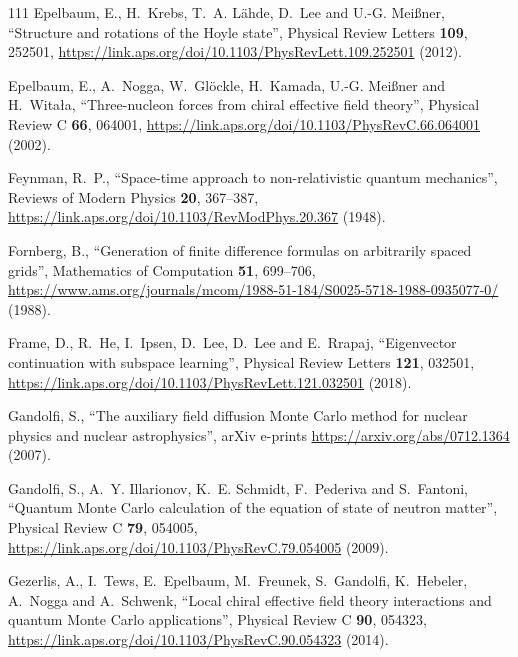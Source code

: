 \documentclass[12pt,letterpaper,UTF8]{report}
\begin{document}
{\begin{thebibliography}{111}
Epelbaum, E., H.~Krebs, T.~A. L\"ahde, D.~Lee and U.-G. Mei\ss{}ner,
  \enquote{Structure and rotations of the {Hoyle} state}, Physical Review
  Letters \textbf{109}, 252501,
  \urlprefix\url{https://link.aps.org/doi/10.1103/PhysRevLett.109.252501}
  (2012).

Epelbaum, E., A.~Nogga, W.~Gl\"ockle, H.~Kamada, U.-G. Mei\ss{}ner and
  H.~Wita\l{}a, \enquote{Three-nucleon forces from chiral effective field
  theory}, Physical Review C \textbf{66}, 064001,
  \urlprefix\url{https://link.aps.org/doi/10.1103/PhysRevC.66.064001} (2002).

Feynman, R.~P., \enquote{Space-time approach to non-relativistic quantum
  mechanics}, Reviews of Modern Physics \textbf{20}, 367--387,
  \urlprefix\url{https://link.aps.org/doi/10.1103/RevModPhys.20.367} (1948).

Fornberg, B., \enquote{Generation of finite difference formulas on arbitrarily
  spaced grids}, Mathematics of Computation \textbf{51}, 699--706,
  \urlprefix\url{https://www.ams.org/journals/mcom/1988-51-184/S0025-5718-1988-0935077-0/}
  (1988).

Frame, D., R.~He, I.~Ipsen, D.~Lee, D.~Lee and E.~Rrapaj, \enquote{Eigenvector
  continuation with subspace learning}, Physical Review Letters \textbf{121},
  032501,
  \urlprefix\url{https://link.aps.org/doi/10.1103/PhysRevLett.121.032501}
  (2018).

Gandolfi, S., \enquote{The auxiliary field diffusion {Monte} {Carlo} method for
  nuclear physics and nuclear astrophysics}, arXiv e-prints
  \urlprefix\url{https://arxiv.org/abs/0712.1364} (2007).

Gandolfi, S., A.~Y. Illarionov, K.~E. Schmidt, F.~Pederiva and S.~Fantoni,
  \enquote{Quantum {Monte} {Carlo} calculation of the equation of state of
  neutron matter}, Physical Review C \textbf{79}, 054005,
  \urlprefix\url{https://link.aps.org/doi/10.1103/PhysRevC.79.054005} (2009).

Gezerlis, A., I.~Tews, E.~Epelbaum, M.~Freunek, S.~Gandolfi, K.~Hebeler,
  A.~Nogga and A.~Schwenk, \enquote{Local chiral effective field theory
  interactions and quantum {Monte} {Carlo} applications}, Physical Review C
  \textbf{90}, 054323,
  \urlprefix\url{https://link.aps.org/doi/10.1103/PhysRevC.90.054323} (2014).


\end{thebibliography}}
\end{document}
